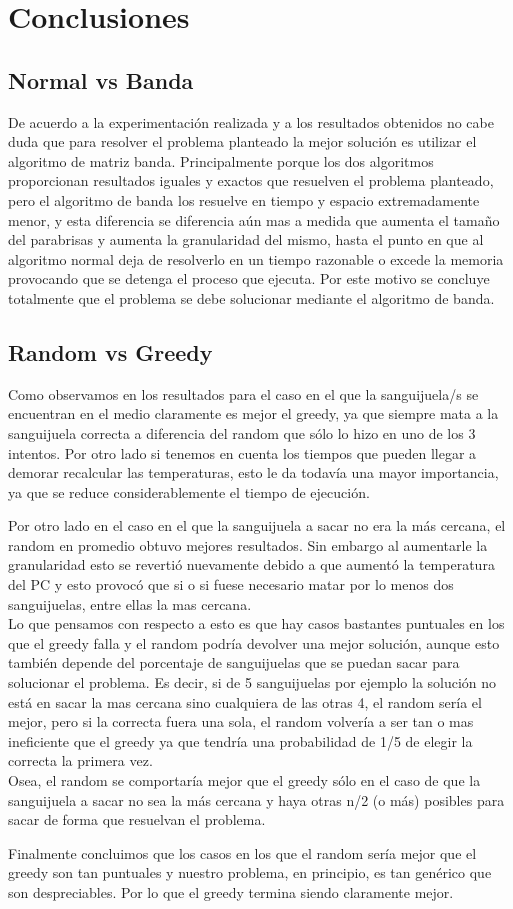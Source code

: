 \section{Conclusiones}

\subsection{Normal vs Banda}

De acuerdo a la experimentación realizada y a los resultados obtenidos no cabe duda que para resolver el problema planteado la mejor solución es utilizar el algoritmo de matriz banda. Principalmente porque los dos algoritmos proporcionan resultados iguales y exactos que resuelven el problema planteado, pero el algoritmo de banda los resuelve en tiempo y espacio extremadamente menor, y esta diferencia se diferencia aún mas a medida que aumenta el tamaño del parabrisas y aumenta la granularidad del mismo, hasta el punto en que al algoritmo normal deja de resolverlo en un tiempo razonable o excede la memoria provocando que se detenga el proceso que ejecuta. Por este motivo se concluye totalmente que el problema se debe solucionar mediante el algoritmo de banda.

\subsection{Random vs Greedy}

Como observamos en los resultados para el caso en el que la sanguijuela/s se encuentran en el medio claramente es mejor el greedy, ya que siempre mata a la sanguijuela correcta a diferencia del random que sólo lo hizo en uno de los 3 intentos. Por otro lado si tenemos en cuenta los tiempos que pueden llegar a demorar recalcular las temperaturas, esto le da todavía una mayor importancia, ya que se reduce considerablemente el tiempo de ejecución.

Por otro lado en el caso en el que la sanguijuela a sacar no era la más cercana, el random en promedio obtuvo mejores resultados. Sin embargo al aumentarle la granularidad esto se revertió nuevamente debido a que aumentó la temperatura del PC y esto provocó que si o si fuese necesario matar por lo menos dos sanguijuelas, entre ellas la mas cercana. \\
Lo que pensamos con respecto a esto es que hay casos bastantes puntuales en los que el greedy falla y el random podría devolver una mejor solución, aunque esto también depende del porcentaje de sanguijuelas que se puedan sacar para solucionar el problema. Es decir, si de 5 sanguijuelas por ejemplo la solución no está en sacar la mas cercana sino cualquiera de las otras 4, el random sería el mejor, pero si la correcta fuera una sola, el random volvería a ser tan o mas ineficiente que el greedy ya que tendría una probabilidad de 1/5 de elegir la correcta la primera vez.\\
Osea, el random se comportaría mejor que el greedy sólo en el caso de que la sanguijuela a sacar no sea la más cercana y haya otras n/2 (o más) posibles para sacar de forma que resuelvan el problema.

Finalmente concluimos que los casos en los que el random sería mejor que el greedy son tan puntuales y nuestro problema, en principio, es tan genérico que son despreciables. Por lo que el greedy termina siendo claramente mejor.





